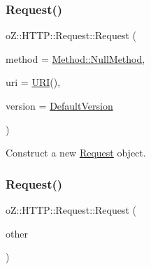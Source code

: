 \subsubsection{\texorpdfstring{Request()}{Request()}\hspace{0.1cm}{\footnotesize\ttfamily [1/3]}}
{\footnotesize\ttfamily o\+Z\+::\+H\+T\+T\+P\+::\+Request\+::\+Request (\begin{DoxyParamCaption}\item[{\mbox{\hyperlink{namespaceo_z_1_1_h_t_t_p_a02d8497e4abbb0adf3af0fe9fad1b7a6}{Method}}}]{method = {\ttfamily \mbox{\hyperlink{namespaceo_z_1_1_h_t_t_p_a02d8497e4abbb0adf3af0fe9fad1b7a6a82b54b33ea69c9433dc272365308285b}{Method\+::\+Null\+Method}}},  }\item[{\mbox{\hyperlink{namespaceo_z_1_1_h_t_t_p_a6d47156e2eac27750983fc1b54bd2ff8}{U\+RI}} \&\&}]{uri = {\ttfamily \mbox{\hyperlink{namespaceo_z_1_1_h_t_t_p_a6d47156e2eac27750983fc1b54bd2ff8}{U\+RI}}()},  }\item[{\mbox{\hyperlink{structo_z_1_1_h_t_t_p_1_1_version}{Version}}}]{version = {\ttfamily \mbox{\hyperlink{namespaceo_z_1_1_h_t_t_p_af1d13b042d8595fb3196ce91c5c4955d}{Default\+Version}}} }\end{DoxyParamCaption})\hspace{0.3cm}{\ttfamily [inline]}}



Construct a new \mbox{\hyperlink{classo_z_1_1_h_t_t_p_1_1_request}{Request}} object. 

\mbox{\label{classo_z_1_1_h_t_t_p_1_1_request_a0912395e7f1d4b61ceb28754ba02498f}} 
\subsubsection{\texorpdfstring{Request()}{Request()}\hspace{0.1cm}{\footnotesize\ttfamily [2/3]}}
{\footnotesize\ttfamily o\+Z\+::\+H\+T\+T\+P\+::\+Request\+::\+Request (\begin{DoxyParamCaption}\item[{const \mbox{\hyperlink{classo_z_1_1_h_t_t_p_1_1_request}{Request}} \&}]{other }\end{DoxyParamCaption})\hspace{0.3cm}{\ttfamily [default]}}



